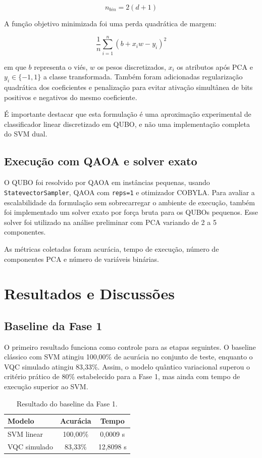 \documentclass[12pt]{unisenaiclass}
\begin{document}
\[
n_{bin} = 2(d + 1)
\]

A função objetivo minimizada foi uma perda quadrática de margem:

\[
\frac{1}{n}\sum_{i=1}^{n}(b + x_iw - y_i)^2
\]

em que \(b\) representa o viés, \(w\) os pesos discretizados, \(x_i\) os atributos após PCA e \(y_i \in \{-1, 1\}\) a classe transformada. Também foram adicionadas regularização quadrática dos coeficientes e penalização para evitar ativação simultânea de bits positivos e negativos do mesmo coeficiente.

É importante destacar que esta formulação é uma aproximação experimental de classificador linear discretizado em QUBO, e não uma implementação completa do SVM dual.

\subsection{Execução com QAOA e solver exato}

O QUBO foi resolvido por QAOA em instâncias pequenas, usando \texttt{StatevectorSampler}, QAOA com \texttt{reps=1} e otimizador COBYLA. Para avaliar a escalabilidade da formulação sem sobrecarregar o ambiente de execução, também foi implementado um solver exato por força bruta para os QUBOs pequenos. Esse solver foi utilizado na análise preliminar com PCA variando de 2 a 5 componentes.

As métricas coletadas foram acurácia, tempo de execução, número de componentes PCA e número de variáveis binárias.

\clearpage

\section{Resultados e Discussões}

\subsection{Baseline da Fase 1}

O primeiro resultado funciona como controle para as etapas seguintes. O baseline clássico com SVM atingiu 100,00\% de acurácia no conjunto de teste, enquanto o VQC simulado atingiu 83,33\%. Assim, o modelo quântico variacional superou o critério prático de 80\% estabelecido para a Fase 1, mas ainda com tempo de execução superior ao SVM.

\begin{table}[H]
    \centering
    \caption{Resultado do baseline da Fase 1.}
    \label{tab:baseline}
    \begin{tabular}{lcc}
        \toprule
        Modelo & Acurácia & Tempo \\
        \midrule
        SVM linear & 100,00\% & 0,0009 s \\
        VQC simulado & 83,33\% & 12,8098 s \\
        \bottomrule
    \end{tabular}
\end{table}
\end{document}
